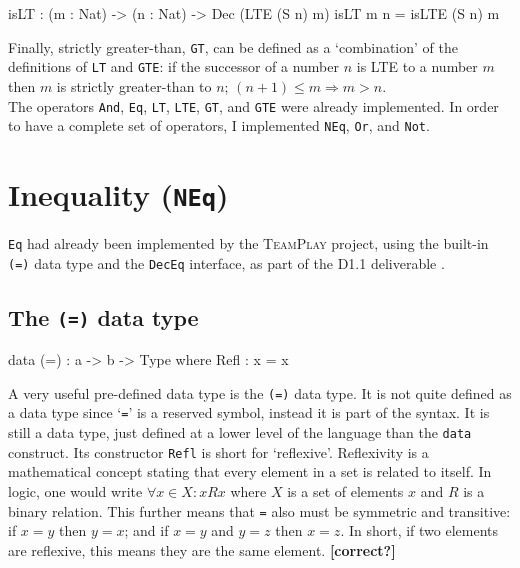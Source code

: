         \begin{code}[caption={\texttt{GT} can be defined based on \texttt{LTE}}]
        isLT : (m : Nat) -> (n : Nat) -> Dec (LTE (S n) m)
        isLT m n = isLTE (S n) m
        \end{code}
        
        Finally, strictly greater-than, \texttt{GT}, can be defined as a `combination' of the definitions of \texttt{LT} and \texttt{GTE}: if the successor of a number $n$ is LTE to a number $m$ then $m$ is strictly greater-than to $n$; $(n + 1) \leq m \Rightarrow m > n$.
        \\
        
        The operators \texttt{And}, \texttt{Eq}, \texttt{LT}, \texttt{LTE}, \texttt{GT}, and \texttt{GTE} were already implemented. In order to have a complete set of operators, I implemented \texttt{NEq}, \texttt{Or}, and \texttt{Not}.


\section{Inequality (\texttt{NEq})}\label{des:neq}
    \texttt{Eq} had already been implemented by the \textsc{TeamPlay} project, using the built-in \texttt{(=)} data type and the \texttt{DecEq} interface, as part of the D1.1 deliverable \cite{teamplay:d1.1}.
    
    \subsection{The \texttt{(=)} data type}
        \begin{code}[label={des:refl-concept}, caption={The concept of an equality data type}]
        data (=) : a -> b -> Type where
            Refl : x = x
        \end{code}
    
        A very useful pre-defined data type is the \texttt{(=)} data type. It is not quite defined as a data type since `\texttt{=}' is a reserved symbol, instead it is part of the \Idris syntax. It is still a data type, just defined at a lower level of the language than the \texttt{data} construct. Its constructor \texttt{Refl} is short for `reflexive'. Reflexivity is a mathematical concept stating that every element in a set is related to itself. In logic, one would write $\forall x \in X : x R x$ where $X$ is a set of elements $x$ and $R$ is a binary relation. This further means that \texttt{=} also must be symmetric and transitive: if $x = y$ then $y = x$; and if $x = y$ and $y = z$ then $x = z$. In short, if two elements are reflexive, this means they are the same element. \textbf{[correct?]}
    
